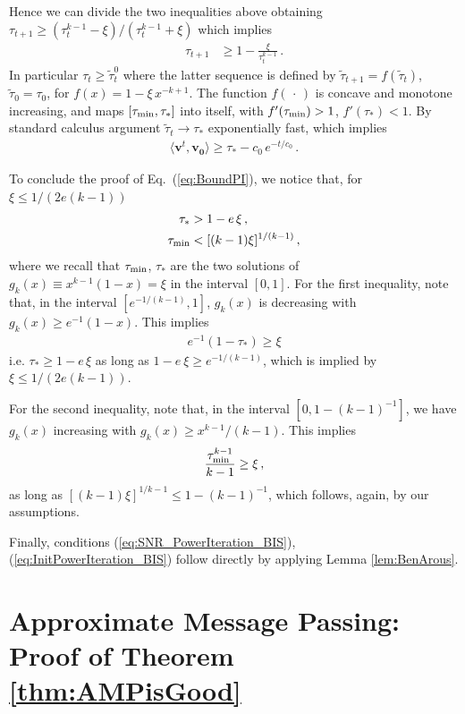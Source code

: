 \documentclass[11pt]{article}
\theoremstyle{definition}
\def\ttau{\tilde{\tau}}
\def\<{\langle}
\def\>{\rangle}
\def\bv{\mathbf{v}}
\def\bvz{\mathbf{v_0}}
\begin{document}
Hence we can divide the two inequalities  above 
obtaining $\tau_{t+1} \ge (\tau_t^{k-1}-\xi)/(\tau_t^{k-1}+\xi)$ which implies
%
\begin{align}
%
\tau_{t+1}
&\ge 1 -\frac{\xi}{\tau_t^{k-1}}\, .
%
\end{align}
%
In particular $\tau_t\ge \ttau_t^0$ where the latter sequence
is defined by $\ttau_{t+1} = f(\ttau_t)$, $\ttau_0 = \tau_0$, for  
$f(x) = 1-\xi\, x^{-k+1}$. The function $f(\, \cdot\, )$ is concave
and monotone increasing, and   maps $[\tau_{\rm min},\tau_*]$
into itself,  with $f'(\tau_{\rm min}) >1$, $f'(\tau_*)<1$. By
standard calculus argument  $\ttau_t\to \tau_*$ exponentially fast,
which implies
%
\begin{align}
%
\<\bv^t,\bvz\> \ge \tau_* - c_0 \, e^{-t/c_0}\, .
%
\end{align}
%

To conclude the proof of Eq.~(\ref{eq:BoundPI}), we notice that, for $\xi\le 1/(2e(k-1))$
%
\begin{align}
%
\tau_* & > 1- e\, \xi\, ,\\
\tau_{\rm min}& < [(k-1)\xi]^{1/(k-1)}\, ,
%
\end{align}
%
where we recall that $\tau_{\rm min}$, $\tau_*$ are the two solutions
of $g_k(x) \equiv x^{k-1}(1-x) = \xi$ in the interval $[0,1]$. 
For the first inequality, note that, in the interval
$[e^{-1/(k-1)},1]$, $g_k(x)$ is decreasing with $g_k(x)\ge
e^{-1}(1-x)$.
This implies 
%
\begin{align}
%
e^{-1}(1-\tau_*) \ge \xi
%
\end{align}
%
i.e. $\tau_*\ge 1-e\,\xi$ as long as $1-e~ \xi\ge  e^{-1/(k-1)}$,
which is implied by $\xi\le 1/(2e(k-1))$.

For the second inequality, note that, in the interval
$[0,1-(k-1)^{-1}]$,
we have $g_k(x)$ increasing with $g_k(x) \ge x^{k-1}/(k-1)$. This implies
%
\begin{align}
%
\frac{\tau_{\rm min}^{k-1}}{k-1}\ge \xi\, ,
%
\end{align}
%
as long as $ [(k-1)\xi]^{1/k-1}\le 1-(k-1)^{-1}$,  which follows,
again, by our assumptions.

Finally, conditions (\ref{eq:SNR_PowerIteration_BIS}),
(\ref{eq:InitPowerIteration_BIS})
follow directly by applying Lemma \ref{lem:BenArous}.
%
%
%
\section{Approximate Message Passing: Proof of Theorem \ref{thm:AMPisGood}}
\end{document}
